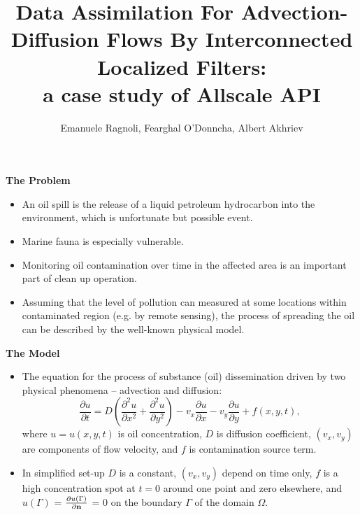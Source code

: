 \documentclass[12pt]{beamer}
\title[AD equation solver based on Allscale API]{
\myTitle Data Assimilation For Advection-Diffusion Flows By Interconnected Localized Filters: \\ a case study of Allscale API}
\author[IBM Research Ireland 2017]
{{\small Emanuele Ragnoli,  Fearghal O'Donncha,  Albert Akhriev} \\ \vspace{0.5em}{\large IBM Research Ireland}}
\newcommand{\myTitle}{\rmfamily\bfseries}
\begin{document}
\begin{frame}
\maketitle
\end{frame}

\begin{frame}{\myTitle The Problem}
\begin{itemize}
\item An oil spill is the release of a liquid petroleum hydrocarbon into the environment, which is unfortunate but possible event.
\item Marine fauna is especially vulnerable.
\item Monitoring oil contamination over time in the affected area is an important part of clean up operation.
\item Assuming that the level of pollution can measured at some locations within contaminated region (e.g. by remote sensing), the process of spreading the oil can be described by the well-known physical model.
\end{itemize}
\end{frame}

\begin{frame}{\myTitle The Model}
\begin{itemize}
\item The equation for the process of substance (oil) dissemination driven by two physical phenomena -- advection and diffusion:   
$$
\frac{\partial u}{\partial t} = 
D \left( \frac{\partial^2 u}{\partial x^2} +  \frac{\partial^2 u}{\partial y^2} \right)
- v_x \frac{\partial u}{\partial x} - v_y \frac{\partial u}{\partial y} + f(x,y,t),
$$
where $u = u(x,y,t)$ is oil concentration, $D$ is diffusion coefficient, $(v_x, v_y)$ are components of flow velocity, and $f$ is contamination source term.
\item In simplified set-up $D$ is a constant, $(v_x, v_y)$ depend on time only, $f$ is a high concentration spot at  $t=0$ around one point and zero elsewhere, and $u(\Gamma)$ = $\frac{\partial u(\Gamma)}{\partial {\bf n}}$ = 0 on the boundary $\Gamma$ of the domain $\Omega$.
\end{itemize}
\end{frame}
\end{document}
